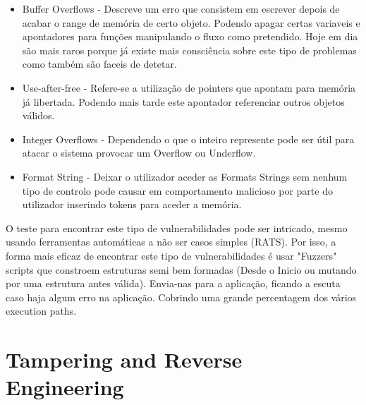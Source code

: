 \begin{itemize}

\item Buffer Overflows - Descreve um erro que consistem em escrever depois de acabar o range de memória de certo objeto. Podendo apagar certas variaveis e apontadores para funções manipulando o fluxo como pretendido. Hoje em dia são mais raros porque já existe mais consciência sobre este tipo de problemas como também são faceis de detetar.

\item Use-after-free - Refere-se a utilização de pointers que apontam para memória já libertada. Podendo mais tarde este apontador referenciar outros objetos válidos.

\item Integer Overflows - Dependendo o que o inteiro represente pode ser útil para atacar o sistema provocar um Overflow ou Underflow.

\item Format String - Deixar o utilizador aceder as Formats Strings sem nenhum tipo de controlo pode causar em comportamento malicioso por parte do utilizador inserindo tokens para aceder a memória.

\end{itemize}

O teste para encontrar este tipo de vulnerabilidades pode ser intricado, mesmo usando ferramentas automáticas a não ser casos simples (RATS). Por isso, a forma mais eficaz de encontrar este tipo de vulnerabilidades é usar "Fuzzers" scripts que constroem estruturas semi bem formadas (Desde o Inicio ou mutando por uma estrutura antes válida). Envia-nas para a aplicação, ficando a escuta caso haja algum erro na aplicação. Cobrindo uma grande percentagem dos vários execution paths.

\section{Tampering and Reverse Engineering}

